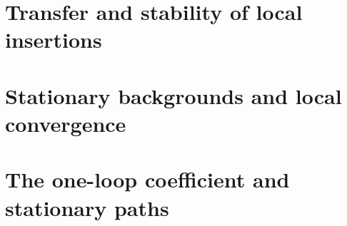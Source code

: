 \documentclass[11pt]{article}
\theoremstyle{remark}
\numberwithin{equation}{section}
\begin{document}
\section{Transfer and stability of local insertions}











\section{Stationary backgrounds and local convergence}












\section{The one-loop coefficient and stationary paths}





















\end{document}
